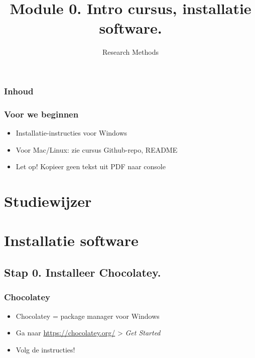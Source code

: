 \documentclass[aspectratio=169]{beamer}
\title{Module 0. Intro cursus, installatie software.}
\subtitle{Research Methods}
\author{\lecturers}   %
\date{\academicyear}
\begin{document}
\begin{frame}
  \maketitle
\end{frame}

\begin{frame}
  \frametitle{Inhoud}

  \tableofcontents
\end{frame}


\begin{frame}
  \frametitle{Voor we beginnen}

  \begin{itemize}
    \item Installatie-instructies voor Windows
    \item Voor Mac/Linux: zie cursus Github-repo, README
    \item Let op! Kopieer geen tekst uit PDF naar console
  \end{itemize}

\end{frame}

\section{Studiewijzer}

\section{Installatie software}

\subsection{Stap 0. Installeer Chocolatey.}

\begin{frame}
  \frametitle{Chocolatey}

  \begin{itemize}
    \item Chocolatey = package manager voor Windows
    \item Ga naar \url{https://chocolatey.org/} > \emph{Get Started}
    \item Volg de instructies!
  \end{itemize}

\end{frame}
\end{document}
